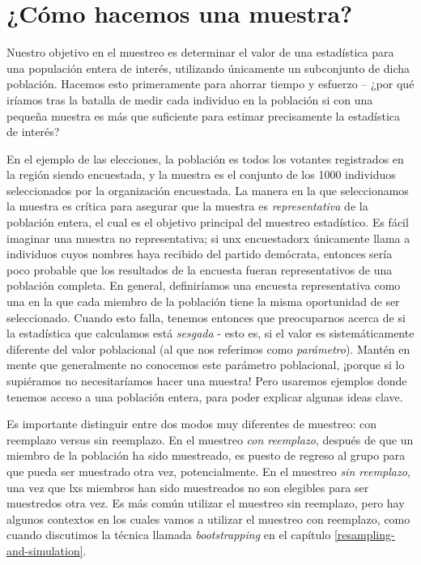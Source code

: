\documentclass[
  12pt,
]{book}
\theoremstyle{definition}
\theoremstyle{definition}
\theoremstyle{definition}
\theoremstyle{remark}
\begin{document}
\hypertarget{how-do-we-sample}{%
\section{¿Cómo hacemos una muestra?}\label{how-do-we-sample}}

Nuestro objetivo en el muestreo es determinar el valor de una estadística para una populación entera de interés, utilizando únicamente un subconjunto de dicha población. Hacemos esto primeramente para ahorrar tiempo y esfuerzo -- ¿por qué iríamos tras la batalla de medir cada individuo en la población si con una pequeña muestra es más que suficiente para estimar precisamente la estadística de interés?

En el ejemplo de las elecciones, la población es todos los votantes registrados en la región siendo encuestada, y la muestra es el conjunto de los 1000 individuos seleccionados por la organización encuestada. La manera en la que seleccionamos la muestra es crítica para asegurar que la muestra es \emph{representativa} de la población entera, el cual es el objetivo principal del muestreo estadístico. Es fácil imaginar una muestra no representativa; si unx encuestadorx únicamente llama a individuos cuyos nombres haya recibido del partido demócrata, entonces sería poco probable que los resultados de la encuesta fueran representativos de una población completa. En general, definiríamos una encuesta representativa como una en la que cada miembro de la población tiene la misma oportunidad de ser seleccionado. Cuando esto falla, tenemos entonces que preocuparnos acerca de si la estadística que calculamos está \emph{sesgada} - esto es, si el valor es sistemáticamente diferente del valor poblacional (al que nos referimos como \emph{parámetro}). Mantén en mente que generalmente no conocemos este parámetro poblacional, ¡porque si lo supiéramos no necesitaríamos hacer una muestra! Pero usaremos ejemplos donde tenemos acceso a una población entera, para poder explicar algunas ideas clave.

Es importante distinguir entre dos modos muy diferentes de muestreo: con reemplazo versus sin reemplazo. En el muestreo \emph{con reemplazo}, después de que un miembro de la población ha sido muestreado, es puesto de regreso al grupo para que pueda ser muestrado otra vez, potencialmente. En el muestreo \emph{sin reemplazo}, una vez que lxs miembros han sido muestreados no son elegibles para ser muestredos otra vez. Es más común utilizar el muestreo sin reemplazo, pero hay algunos contextos en los cuales vamos a utilizar el muestreo con reemplazo, como cuando discutimos la técnica llamada \emph{bootstrapping} en el capítulo \ref{resampling-and-simulation}.
\end{document}
